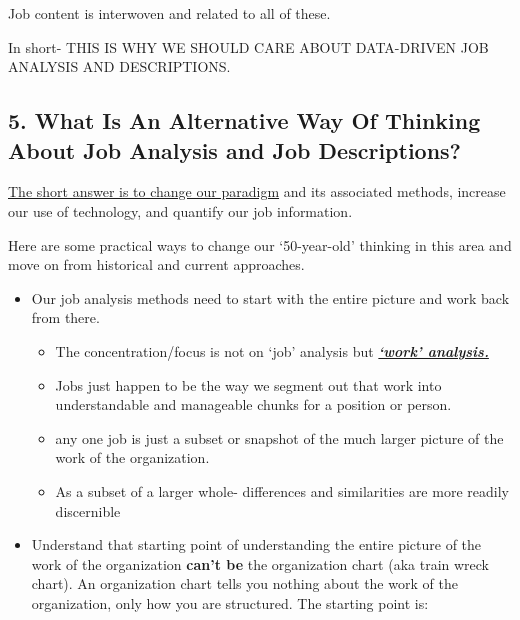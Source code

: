 \documentclass[12pt,letterpaper]{article}
\begin{document}
{{{Job content is interwoven and related to all of these.

In short- THIS IS WHY WE SHOULD CARE ABOUT DATA-DRIVEN JOB ANALYSIS AND
DESCRIPTIONS.

\subsection{5. What Is An Alternative Way Of Thinking About Job Analysis
and Job
Descriptions?}
\underline{The short answer is to change our paradigm} and its associated
methods, increase our use of technology, and quantify our job
information.

Here are some practical ways to change our `50-year-old' thinking in
this area and move on from historical and current approaches.
\begin{itemize}
\item
  Our job analysis methods need to start with the entire picture and
  work back from there.

  \begin{itemize}
  \item
    The concentration/focus is not on `job' analysis but
    \underline{\textbf{\emph{`work' analysis.}}}
  \item
    Jobs just happen to be the way we segment out that work into
    understandable and manageable chunks for a position or person.
  \item
    any one job is just a subset or snapshot of the much larger picture
    of the work of the organization.
  \item
    As a subset of a larger whole- differences and similarities are more
    readily discernible
  \end{itemize}
\item
  Understand that starting point of understanding the entire picture of
  the work of the organization \textbf{can't be} the organization chart
  (aka train wreck chart). An organization chart tells you nothing about
  the work of the organization, only how you are structured. The
  starting point is:


\end{itemize}}}}
\end{document}
